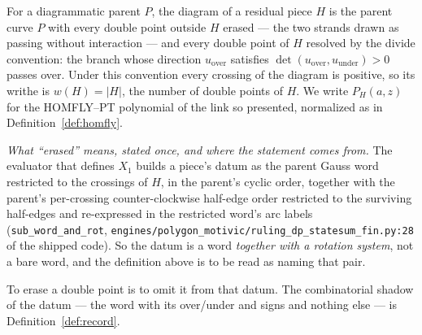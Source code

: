 \begin{definition}\label{def:piecediagram}
For a diagrammatic parent $P$, the diagram of a residual piece $H$ is the parent
curve $P$ with every double
point outside $H$ erased --- the two strands drawn as passing without
interaction --- and every double point of $H$ resolved by the divide convention:
the branch whose direction $u_{\mathrm{over}}$ satisfies
$\det(u_{\mathrm{over}},u_{\mathrm{under}})>0$ passes over. Under this convention
every crossing of the diagram is positive, so its writhe is
$w(H)=|H|$, the number of double points of $H$. We write $P_H(a,z)$ for the
HOMFLY--PT polynomial of the link so presented, normalized as in
Definition~\ref{def:homfly}.

\emph{What ``erased'' means, stated once, and where the statement comes from.}
The evaluator that defines $X_1$ builds a piece's datum as the parent Gauss word
restricted to the crossings of $H$, in the parent's cyclic order, together with
the parent's per-crossing counter-clockwise half-edge order restricted to the
surviving half-edges and re-expressed in the restricted word's arc labels
(\texttt{sub\_word\_and\_rot},
\texttt{engines/polygon\_motivic/ruling\_dp\_statesum\_fin.py:28} of the shipped
code). So the datum is a word \emph{together with a rotation system}, not a bare
word, and the definition above is to be read as naming that pair.

To erase a double point is to omit it from that datum. The combinatorial shadow
of the datum --- the word with its over/under and signs and nothing else --- is
Definition~\ref{def:record}.
\end{definition}

